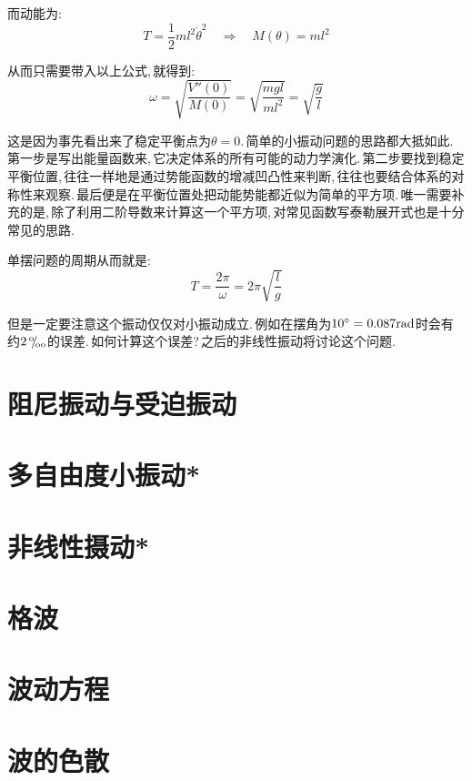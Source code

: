 而动能为:
\[T=\frac{1}{2}ml^2\dot{\theta}^2\quad \Rightarrow\quad M(\theta)=ml^2\]

从而只需要带入以上公式,\,就得到:
\[\omega=\sqrt{\frac{V''(0)}{M(0)}}=\sqrt{\frac{mgl}{ml^2}}=\sqrt{\frac{g}{l}}\]

这是因为事先看出来了稳定平衡点为$\theta=0$.\,简单的小振动问题的思路都大抵如此.\,第一步是写出能量函数来,\,它决定体系的所有可能的动力学演化.\,第二步要找到稳定平衡位置,\,往往一样地是通过势能函数的增减凹凸性来判断,\,往往也要结合体系的对称性来观察.\,最后便是在平衡位置处把动能势能都近似为简单的平方项.\,唯一需要补充的是,\,除了利用二阶导数来计算这一个平方项,\,对常见函数写泰勒展开式也是十分常见的思路.

单摆问题的周期从而就是:
\[T=\frac{2\pi}{\omega}=2\pi\sqrt{\frac{l}{g}}\]

但是一定要注意这个振动仅仅对小振动成立.\,例如在摆角为$10^\circ=0.087{\rm rad}$时会有约$2{\,}^\text{o}\mkern-5mu/\mkern-3mu_\text{oo}$的误差.\,如何计算这个误差?\,之后的非线性振动将讨论这个问题.




\section{阻尼振动与受迫振动}




\section{多自由度小振动*}

\section{非线性摄动*}

\section{格波}

\section{波动方程}

\section{波的色散}

